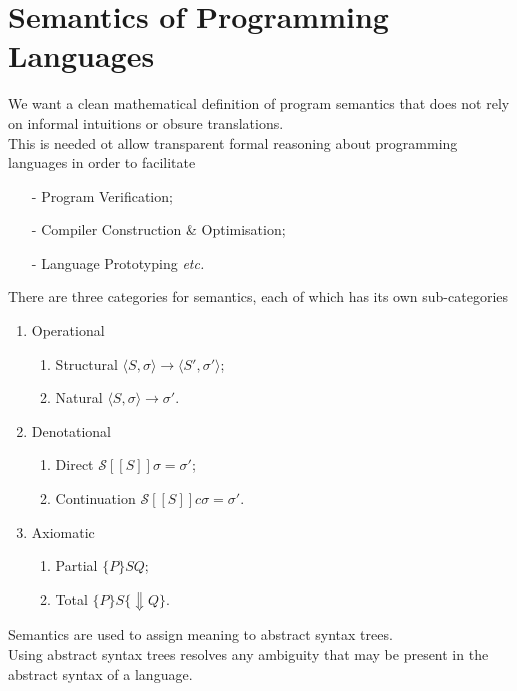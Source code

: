 \documentclass[11pt,a4paper]{article}
\begin{document}
\section{Semantics of Programming Languages}

We want a clean mathematical definition of program semantics that does not rely on informal intuitions or obsure translations.\\
This is needed ot allow transparent formal reasoning about programming languages in order to facilitate
\begin{itemize}
	\item[-] Program Verification;
	\item[-] Compiler Construction \& Optimisation;
	\item[-] Language Prototyping \textit{etc.}
\end{itemize}

There are three categories for semantics, each of which has its own sub-categories
\begin{enumerate}
	\item Operational
	\begin{enumerate}
		\item Structural $\langle S,\sigma\rangle\to\langle S',\sigma'\rangle$;
		\item Natural $ \langle S,\sigma\rangle\to\sigma'$.
	\end{enumerate}
	\item Denotational
	\begin{enumerate}
		\item Direct $\mathcal{S}[[S]]\sigma=\sigma'$;
		\item Continuation $\mathcal{S}[[S]]c\sigma=\sigma'$.
	\end{enumerate}
	\item Axiomatic
	\begin{enumerate}
		\item Partial $\{P\}S{Q}$;
		\item Total $\{P\}S\{\Downarrow Q\}$.
	\end{enumerate}
\end{enumerate}

Semantics are used to assign meaning to abstract syntax trees.\\
Using abstract syntax trees resolves any ambiguity that may be present in the abstract syntax of a language.\\
\end{document}
